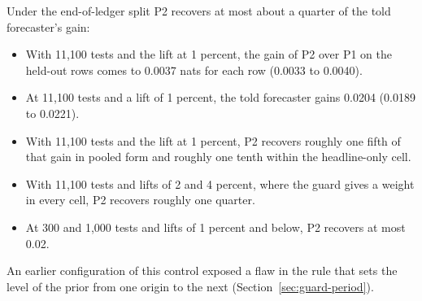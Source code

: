 Under the end-of-ledger split P2 recovers at most about a quarter of the told forecaster's gain:
\begin{itemize}
\item With 11,100 tests and the lift at 1 percent, the gain of P2 over P1 on the held-out rows comes to 0.0037 nats for each row (0.0033 to 0.0040).
\item At 11,100 tests and a lift of 1 percent, the told forecaster gains 0.0204 (0.0189 to 0.0221).
\item With 11,100 tests and the lift at 1 percent, P2 recovers roughly one fifth of that gain in pooled form and roughly one tenth within the headline-only cell.
\item With 11,100 tests and lifts of 2 and 4 percent, where the guard gives a weight in every cell, P2 recovers roughly one quarter.
\item At 300 and 1,000 tests and lifts of 1 percent and below, P2 recovers at most 0.02.
\end{itemize}
An earlier configuration of this control exposed a flaw in the rule that sets the level of the prior from one origin to the next (Section~\ref{sec:guard-period}).

